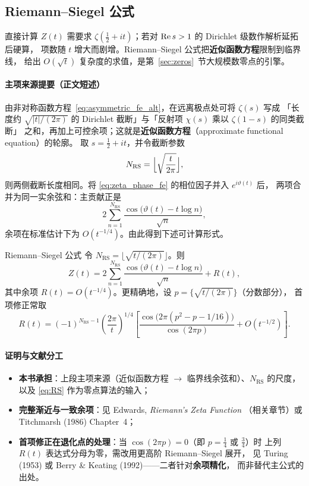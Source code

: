 \subsection{Riemann--Siegel 公式}\label{sec:RS}

直接计算 $Z(t)$ 需要求 $\zeta(\frac12+it)$；若对 $\operatorname{Re} s>1$ 的 Dirichlet 级数作解析延拓后硬算，
项数随 $t$ 增大而剧增。Riemann--Siegel 公式把\textbf{近似函数方程}限制到临界线，
给出 $O(\sqrt{t})$ 复杂度的求值，是第~\ref{sec:zeros}~节大规模数零点的引擎。

\paragraph{主项来源提要（正文短述）}
由非对称函数方程~\eqref{eq:asymmetric_fe_alt}，在远离极点处可将 $\zeta(s)$ 写成
「长度约 $\sqrt{|t|/(2\pi)}$ 的 Dirichlet 截断」与「反射项 $\chi(s)$ 乘以 $\zeta(1-s)$ 的同类截断」
之和，再加上可控余项；这就是\textbf{近似函数方程}（approximate functional equation）的轮廓。
取 $s=\frac12+it$，并令截断参数
\[
  N_{\mathrm{RS}}=\Bigl\lfloor\sqrt{\frac{t}{2\pi}}\Bigr\rfloor,
\]
则两侧截断长度相同。将 \eqref{eq:zeta_phase_fe} 的相位因子并入 $e^{i\vartheta(t)}$ 后，
两项合并为同一实余弦和：主贡献正是
\[
  2\sum_{n=1}^{N_{\mathrm{RS}}}
  \frac{\cos\!\bigl(\vartheta(t)-t\log n\bigr)}{\sqrt{n}},
\]
余项在标准估计下为 $O(t^{-1/4})$。由此得到下述可计算形式。

\begin{theorem}{Riemann--Siegel 公式}{}
令 $N_{\mathrm{RS}} = \lfloor\sqrt{t/(2\pi)}\rfloor$。则
\begin{equation}
  Z(t) = 2\sum_{n=1}^{N_{\mathrm{RS}}} \frac{\cos\!\bigl(\vartheta(t)-t\log n\bigr)}{\sqrt{n}} + R(t),
  \label{eq:RS}
\end{equation}
其中余项 $R(t) = O(t^{-1/4})$。更精确地，设 $p = \{\sqrt{t/(2\pi)}\}$（分数部分），
首项修正常取
\[
R(t) = (-1)^{N_{\mathrm{RS}}-1}\left(\frac{2\pi}{t}\right)^{1/4}
       \left[ \frac{\cos\bigl(2\pi(p^2-p-1/16)\bigr)}{\cos(2\pi p)} + O(t^{-1/2}) \right].
\]
\end{theorem}

\paragraph{证明与文献分工}
\begin{itemize}
  \item \textbf{本书承担}：上段主项来源（近似函数方程 $\to$ 临界线余弦和）、$N_{\mathrm{RS}}$ 的尺度，
        以及 \eqref{eq:RS} 作为零点算法的输入；
  \item \textbf{完整渐近与一致余项}：见 Edwards, \emph{Riemann's Zeta Function}
        （相关章节）或 Titchmarsh (1986) Chapter~4；
  \item \textbf{首项修正在退化点的处理}：当 $\cos(2\pi p)=0$（即 $p=\tfrac14$ 或 $\tfrac34$）时
        上列 $R(t)$ 表达式分母为零，需改用更高阶 Riemann--Siegel 展开，
        见 Turing (1953) 或 Berry \& Keating (1992)——二者针对\textbf{余项精化}，
        而非替代主公式的出处。
\end{itemize}

